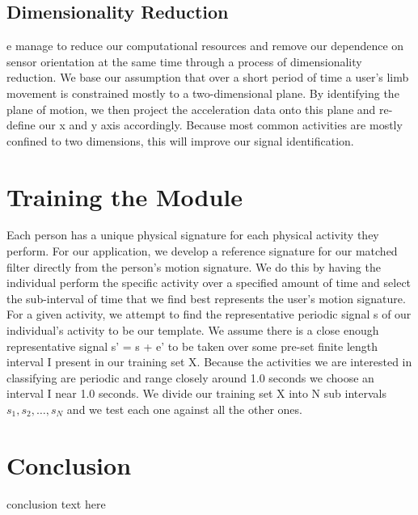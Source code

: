 \documentclass[journal]{IEEEtran}
\begin{document}
\subsection{Dimensionality Reduction}
e manage to reduce our computational resources and remove our dependence on sensor orientation at the same time through a process of dimensionality reduction. We base our assumption that over a short period of time a user’s limb movement is constrained mostly to a two-dimensional plane. By identifying the plane of motion, we then project the acceleration data onto this plane and re-define our x and y axis accordingly. Because most common activities are mostly confined to two dimensions, this will improve our signal identification.
\cite{bgk}
%
\section{Training the Module}
Each person has a unique physical signature for each physical activity they perform. For our application, we develop a reference signature for our matched filter directly from the person’s motion signature. We do this by having the individual perform the specific activity over a specified amount of time and select the sub-interval of time that we find best represents the user's motion signature. For a given activity, we attempt to find the representative periodic signal s of our individual’s activity to be our template. We assume there is a close enough representative signal s’ = s + e’ to be taken over some pre-set finite length interval I present in our training set X. Because the activities we are interested in classifying are periodic and range closely around 1.0 seconds we choose an interval I near 1.0 seconds. We divide our training set X into N sub intervals ${s_1, s_2, …, s_N}$ and we test each one against all the other ones.
%
\section{Conclusion}
conclusion text here
%
\appendices
%
\ifCLASSOPTIONcaptionsoff
  \newpage
\fi
%


\end{document}
